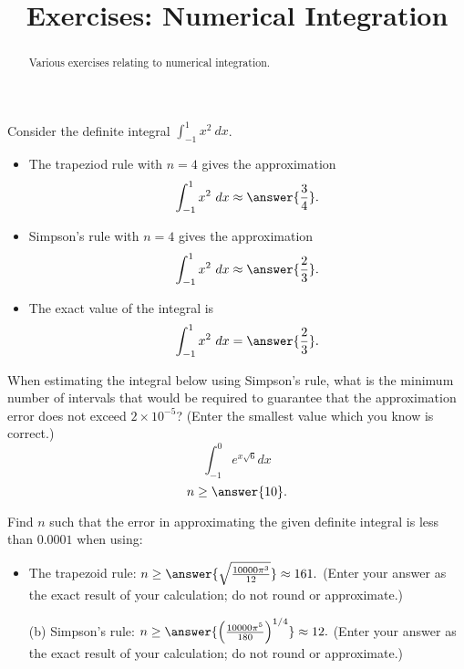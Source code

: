 \documentclass{ximera}
\title{Exercises: Numerical Integration}
\begin{document}
\begin{abstract}
Various exercises relating to numerical integration.
\end{abstract}
\maketitle

\begin{exercise}%
Consider the definite integral  \(\displaystyle \int_{-1}^1 x^2\ dx\).
\begin{itemize}
\item	 The trapeziod rule with \(n=4\) gives the approximation
\[ \int_{-1}^1 x^2 \ dx \approx \answer{\frac{3}{4}}. \]
\item	Simpson's rule with \(n=4\) gives the approximation
\[ \int_{-1}^1 x^2 \ dx \approx \answer{\frac{2}{3}}. \]
\item	The exact value of the integral is
\[ \int_{-1}^1 x^2 \ dx = \answer{\frac{2}{3}}. \]
\end{itemize}
\end{exercise}

\begin{exercise}%
When estimating the integral below using Simpson's rule, what is the minimum number of intervals that would be required to guarantee that the approximation error does not exceed $2 \times 10^{-5}$? (Enter the smallest value which you know is correct.)
\[ \int_{-1}^0 e^{x \sqrt{6}} dx \]
\[ n \geq \answer{10}. \]
\end{exercise}

\begin{exercise}%
Find \(n\) such that the error in approximating the given definite integral is less than \(0.0001\) when using:
\begin{itemize}
\item The trapezoid rule: $n \geq \answer{\sqrt{\frac{10000 \pi^3}{12}}} \approx 161.$ (Enter your answer as the exact result of your calculation; do not round or approximate.)
\item [(b)] Simpson's rule: $n \geq \answer{\left(\frac{10000 \pi^5}{180}\right)^{1/4}} \approx 12.$ (Enter your answer as the exact result of your calculation; do not round or approximate.)
\end{itemize}
\end{exercise}
\end{document}
